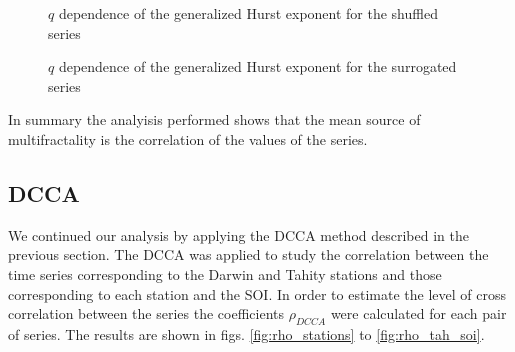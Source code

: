 \documentclass[onecolumn, preprint,aps,amsmath, amssymb, superscriptaddress]{revtex4}
\begin{document}
\begin{figure}
\caption{$q$ dependence of the generalized Hurst exponent for the shuffled series}
\label{fig:h-hshuff}
\end{figure}

\begin{figure}
\caption{$q$ dependence of the generalized Hurst exponent for the surrogated series}
\label{fig:h-hsurr}
\end{figure}


In summary the analyisis performed shows that the mean source of multifractality is the correlation of the values of the series.



\subsection{DCCA}
\label{results_dcca}

We continued our analysis by applying the DCCA method described in the previous section. The DCCA was applied to study the correlation between the time series corresponding to the Darwin and Tahity stations and those corresponding to  each station and the SOI. In order to estimate the level of cross correlation between the series the coefficients $\rho_{DCCA}$ were calculated for each pair of series. The results are shown in figs. \ref{fig:rho_stations} to \ref{fig:rho_tah_soi}.
\end{document}
